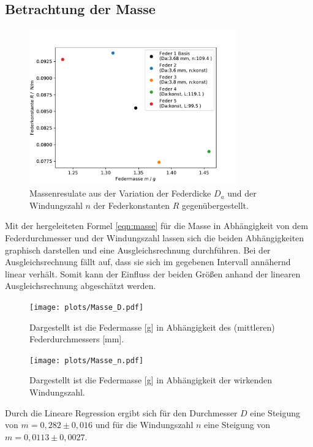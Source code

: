 \subsection{Betrachtung der Masse}
\begin{figure}[H]
  \center
  \includegraphics[width=0.8\textwidth]{plots/masse_konstante_dia.pdf}
  \caption{Massenresulate aus der Variation der Federdicke $D_a$
          und der Windungszahl $n$ der Federkonstanten $R$ gegenübergestellt. }
\end{figure}
Mit der hergeleiteten Formel \ref{eqn:masse} für die Masse in Abhängigkeit von dem Federdurchmesser und der Windungszahl lassen sich die beiden Abhängigkeiten graphisch darstellen und eine Ausgleichsrechnung durchführen.
Bei der Ausgleichsrechnung fällt auf, dass sie sich im gegebenen Intervall annähernd linear verhält. 
Somit kann der Einfluss der beiden Größen anhand der linearen Ausgleichsrechnung 
abgeschätzt werden.
\begin{figure}[H]
  \center
  \texttt{[image: plots/Masse\_D.pdf]}
  \caption{Dargestellt ist die Federmasse [g] in Abhängigkeit des (mittleren) Federdurchmessers [mm].}
\end{figure}
\begin{figure}[H]
  \center
  \texttt{[image: plots/Masse\_n.pdf]}
  \caption{Dargestellt ist die Federmasse [g] in Abhängigkeit der wirkenden Windungszahl. }
\end{figure}
Durch die Lineare Regression ergibt sich für den Durchmesser $D$ eine Steigung von $m = 0,282\pm0,016$ und für die Windungszahl $n$ eine Steigung von $m = 0,0113\pm0,0027$.
\label{sec:Auswertung}
